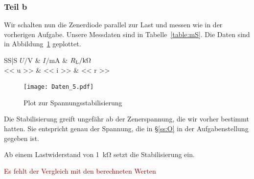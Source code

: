 \subsubsection{Teil b}

Wir schalten nun die Zenerdiode parallel zur Last und messen wie in der
vorherigen Aufgabe. Unsere Messdaten sind in Tabelle~\ref{table:mS}. Die Daten
sind in Abbildung~\ref{fig:Stabilisierung} geplottet.

\begin{table}[htbp]
	\centering
	\caption{%
		Messdaten mit Stabilisierung
	}
	\label{table:mS}
	\begin{tabular}{SS|S}
		{$U / \si\volt$} & {$I / \si{\milli\ampere}$} & {$R_\text L / \si{\kilo\ohm}$} \\
		\hline
		<< u >> & << i >> & << r >> \\
	\end{tabular}
\end{table}

\begin{figure}[htbp]
	\centering
	\caption{%
		Plot zur Spannungsstabilisierung
	}
	\label{fig:Stabilisierung}
	\texttt{[image: Daten\_5.pdf]}
\end{figure}

Die Stabilisierung greift ungefähr ab der Zenerspannung, die wir vorher
bestimmt hatten. Sie entspricht genau der Spannung, die in §\ref{ss:O} in der
Aufgabenstellung gegeben ist.

Ab einem Lastwiderstand von \SI{1}{\kilo\ohm} setzt die Stabilisierung ein.

\textcolor{darkred}{Es fehlt der Vergleich mit den berechneten Werten}

\FloatBarrier
\IfFileExists{\bibliographyfile}{
	
}{}




